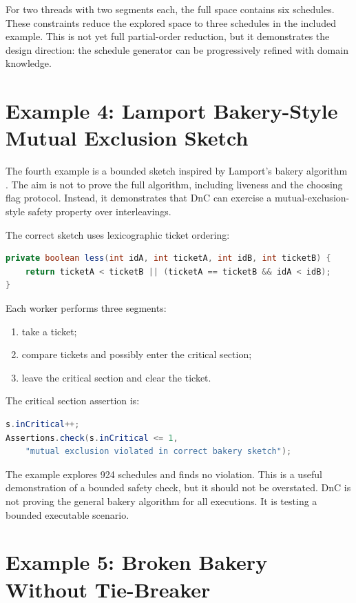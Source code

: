 \documentclass[11pt]{article}
\begin{document}
For two threads with two segments each, the full space contains six schedules. These constraints reduce the explored space to three schedules in the included example. This is not yet full partial-order reduction, but it demonstrates the design direction: the schedule generator can be progressively refined with domain knowledge.

\section{Example 4: Lamport Bakery-Style Mutual Exclusion Sketch}

The fourth example is a bounded sketch inspired by Lamport's bakery algorithm \cite{lamport1974bakery}. The aim is not to prove the full algorithm, including liveness and the choosing flag protocol. Instead, it demonstrates that DnC can exercise a mutual-exclusion-style safety property over interleavings.

The correct sketch uses lexicographic ticket ordering:

\begin{lstlisting}[language=Java]
private boolean less(int idA, int ticketA, int idB, int ticketB) {
    return ticketA < ticketB || (ticketA == ticketB && idA < idB);
}
\end{lstlisting}

Each worker performs three segments:

\begin{enumerate}[nosep]
  \item take a ticket;
  \item compare tickets and possibly enter the critical section;
  \item leave the critical section and clear the ticket.
\end{enumerate}

The critical section assertion is:

\begin{lstlisting}[language=Java]
s.inCritical++;
Assertions.check(s.inCritical <= 1,
    "mutual exclusion violated in correct bakery sketch");
\end{lstlisting}

The example explores 924 schedules and finds no violation. This is a useful demonstration of a bounded safety check, but it should not be overstated. DnC is not proving the general bakery algorithm for all executions. It is testing a bounded executable scenario.

\section{Example 5: Broken Bakery Without Tie-Breaker}
\end{document}
